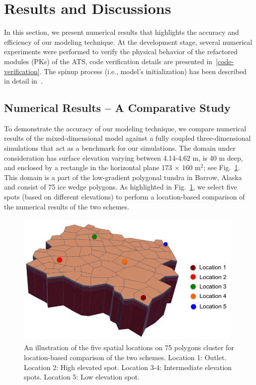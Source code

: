 \documentclass[review]{elsarticle}
\begin{document}
\section{Results and Discussions}\label{numerical-tests}

In this section, we present numerical results that highlights the accuracy and efficiency of our modeling technique. At the development stage, several numerical experiments were performed to verify the physical behavior of the refactored modules (PKs) of the ATS, code verification details are presented in~\ref{code-verification}. The spinup process (i.e., model's initialization) has been described in detail in~\cite{spainter2016integrated}. 


\subsection {Numerical Results -- A Comparative Study} 
To demonstrate the accuracy of our modeling technique, we compare numerical results of the mixed-dimensional model against a fully coupled three-dimensional simulations that act as a benchmark for our simulations. The domain under consideration has surface elevation varying between 4.14-4.62 m, is 40 m deep, and enclosed by a rectangle in the horizontal plane 173 $\times$ 160 m$^2$; see Fig.~\ref{surf-location}. This domain is a part of the low-gradient polygonal tundra in Barrow, Alaska and consist of 75 ice wedge polygons. As highlighted in Fig.~\ref{surf-location}, we select five spots (based on different elevations) to perform a location-based comparison of the numerical results of the two schemes. 
\begin{figure}[!htpb]
\centering
\includegraphics[height = 6.5cm, width=11cm]{figures/lobster75-3d.png}
\caption{An illustration of the five spatial locations on 75 polygons cluster for location-based comparison of the two schemes. Location 1: Outlet. Location 2: High elevated spot. Location 3-4: Intermediate elevation spots. Location 5: Low elevation spot.}
\label{surf-location}
\end{figure}
\end{document}
